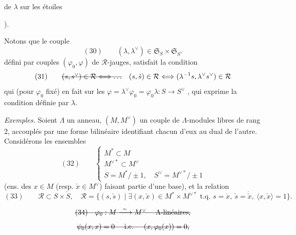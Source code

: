 \documentclass[11pt,a4paper]{article}
\begin{document}
de $\lambda$ sur les étoiles

 ).

Notons que le couple
\[
(30)\qquad (\lambda, \lambda^{\vee}) \in \mathfrak{S}_S \times \mathfrak{S}_{S^{\vee}}
\]
défini par  couples $(\varphi_0, \varphi)$ de
\struck{\ill{}} $\mathcal{R}$-jauges, satisfait la condition
\[
(31)\qquad \text{\struck{$(s, s^{\vee}) \in \mathcal{R} \Longleftrightarrow \ldots$}}\quad
(s, \check{s}) \in \mathcal{R} \Longleftrightarrow (\lambda^{-1}s, \lambda^{\vee} s^{\vee}) \in \mathcal{R}
\]
qui  (pour $\varphi_0$ fixé) en fait  sur les
$\varphi = \lambda^{\vee}\varphi_0 = \varphi_0\lambda : S \to S^{\vee}$
\ill{}, qui exprime la condition définie par \struck{\ill{}} $\lambda$.

\emph{Exemples.} Soient $\Lambda$ un anneau, $(M, M^{\vee})$
un couple de $\Lambda$-modules libres de rang 2, accouplés par une forme
bilinéaire identifiant chacun d'eux au dual de l'autre. Considérons les
 ensembles
\[
(32)\qquad
\begin{cases}
M^{*} \subset M \\
M^{\vee *} \subset M^{\vee} \\
S = M^{*}/\pm 1, \quad S^{\vee} = M^{\vee *}/\pm 1
\end{cases}
\]
(ens. des $x \in M$ (resp. $\check{x} \in M^{\vee}$) faisant partie d'une base),
et la relation
\[
(33)\qquad \mathcal{R} \subset S \times \check{S},\quad
\mathcal{R} = \{(s, \check{s}) \mid \exists (x, \check{x}) \in M^{*} \times M^{\vee *} \text{ t.q. } s = \dot{x},\ \check{s} = \dot{\check{x}},\ \langle x, \check{x} \rangle = 1\}.
\]

\[
\text{\struck{$(34)\quad \varphi_0 : M \xrightarrow{\ \sim\ } M^{\vee}$ \quad $\Lambda$-linéaires,}}
\]
\[
\text{\struck{$\psi_0(x,x) = 0$ \quad i.e. \quad $(x, \varphi_0(x)) = 0$,}}
\]
\end{document}
